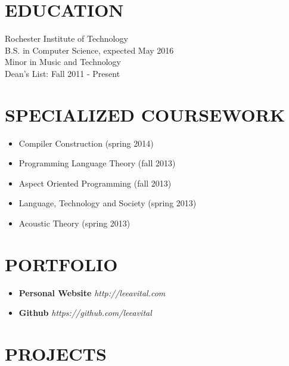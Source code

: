 \documentclass[line,margin]{res}
\begin{document}
\address{80 Colony Manor Drive, Apartment 5\\ Rochester, NY 14623}
\address{(646) 320-9143\\leeavital@gmail.com}


\begin{resume}
 
\section{EDUCATION}  Rochester Institute of Technology \\ 
                     B.S. in  Computer Science,  expected May 2016 \\
	                 Minor in Music and Technology\\
	                 Dean's List: Fall 2011 - Present


\section{SPECIALIZED COURSEWORK}
\begin{itemize} \itemsep -2pt
   \item Compiler Construction (spring 2014)
   \item Programming Language Theory (fall 2013)
   \item Aspect Oriented Programming (fall 2013)
   \item Language, Technology and Society (spring 2013)
   \item Acoustic Theory (spring 2013)
\end{itemize}


\section{PORTFOLIO}

\begin{itemize} \itemsep -2pt
   \item {\bf Personal Website}  {\sl http://leeavital.com}
   \item {\bf Github}	{\sl  https://github.com/leeavital }
\end{itemize}



\section{PROJECTS}


\end{resume}
\end{document}
